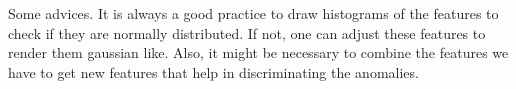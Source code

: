 \documentclass[10pt,a4paper]{article}
\begin{document}
Some advices. It is always a good practice to draw histograms of the
features to check if they are normally distributed. If not, one can
adjust these features to render them gaussian like. Also, it might be
necessary to combine the features we have to get new features that
help in discriminating the anomalies.
\end{document}
